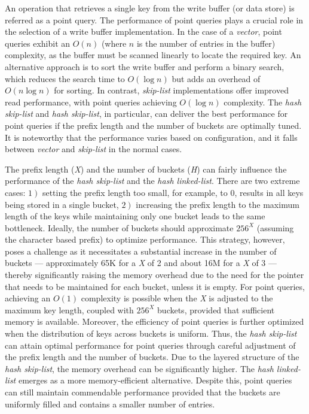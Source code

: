 An operation that retrieves a single key from the write buffer (or data store) is referred as a point query.
The performance of point queries plays a crucial role in the selection of a write buffer implementation.
In the case of a \textit{vector}, point queries exhibit an $O(n)$ (where $n$ is the number of entries in the buffer) complexity, as the buffer must be scanned linearly to locate the required key.
An alternative approach is to sort the write buffer and perform a binary search, which reduces the search time to $O(\log n)$ but adds an overhead of $O(n \log n)$ for sorting.
In contrast, \textit{skip-list} implementations offer improved read performance, with point queries achieving $O(\log n)$ complexity. 
The \textit{hash skip-list} and \textit{hash skip-list}, in particular, can deliver the best performance for point queries if the prefix length and the number of buckets are optimally tuned. 
It is noteworthy that the performance varies based on configuration, and it falls between \textit{vector} and \textit{skip-list} in the normal cases.


The prefix length (\textit{X}) and the number of buckets (\textit{H}) can fairly influence the performance of the \textit{hash skip-list} and the \textit{hash linked-list}. 
There are two extreme cases: $\left. 1\right)$ setting the prefix length too small, for example, to 0, results in all keys being stored in a single bucket, $\left. 2\right)$ increasing the prefix length to the maximum length of the keys while maintaining only one bucket leads to the same bottleneck. 
Ideally, the number of buckets should approximate $256^{\textit{X}}$ (assuming the character based prefix) to optimize performance. 
This strategy, however, poses a challenge as it necessitates a substantial increase in the number of buckets — approximately 65K for a \textit{X} of 2 and about 16M for a \textit{X} of 3 — thereby significantly raising the memory overhead due to the need for the pointer that needs to be maintained for each bucket, unless it is empty.
For point queries, achieving an $O(1)$ complexity is possible when the \textit{X} is adjusted to the maximum key length, coupled with $256^{\textit{X}}$ buckets, provided that sufficient memory is available. 
Moreover, the efficiency of point queries is further optimized when the distribution of keys across buckets is uniform.
Thus, the \textit{hash skip-list} can attain optimal performance for point queries through careful adjustment of the prefix length and the number of buckets. 
Due to the layered structure of the \textit{hash skip-list}, the memory overhead can be significantly higher.
The \textit{hash linked-list} emerges as a more memory-efficient alternative. 
Despite this, point queries can still maintain commendable performance provided that the buckets are uniformly filled and contains a smaller number of entries.



